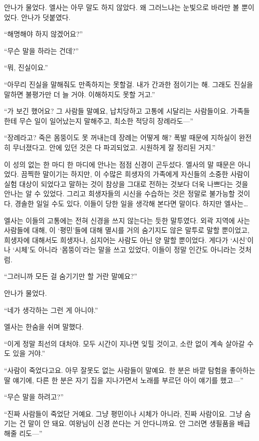 안나가 물었다. 엘사는 아무 말도 하지 않았다. 왜 그러느냐는 눈빛으로 바라만 볼 뿐이었다. 안나가 덧붙였다.

``해명해야 하지 않겠어요?''

``무슨 말을 하라는 건데?''

``뭐, 진실이요.''

``아무리 진실을 말해줘도 만족하지는 못할걸. 내가 간과한 점이기는 해. 그래도 진실을 말하면 불평가만 더 늘 거야. 이해하지도 못할 거고.''

``가 보긴 했어요? 그 사람들 말예요, 납치당하고 고통에 시달리는 사람들이요. 가족들한테 무슨 일이 일어났는지 말해주고, 최소한 적당히 장례라도—''

``장례라고? 죽은 몸뚱이도 못 꺼내는데 장례는 어떻게 해? 폭발 때문에 지하실이 완전히 무너졌다고. 안에 있던 것은 다 파괴되었고. 시원하게 잘 정리된 거지.''

이 성의 없는 한 마디 한 마디에 안나는 점점 신경이 곤두섰다. 엘사의 말 때문은 아니었다. 끔찍한 말이기는 하지만, 이 수많은 희생자의 가족에게 자신들의 소중한 사람이 실험 대상이 되었다고 말하는 것이 참상을 그대로 전하는 것보다 더욱 나쁘다는 것을 안나는 알 수 있었다. 그리고 희생자들의 시신을 수습하는 것은 정말로 불가능할 것이다, 경솔한 일일 수도 있다, 이들이 당한 일을 생각해 본다면 말이다. 하지만 엘사는\ldots

엘사는 이들의 고통에는 전혀 신경을 쓰지 않는다는 듯한 말투였다. 외곽 지역에 사는 사람들에 대해, 이 `평민'들에 대해 멸시를 거의 숨기지도 않은 말투로 말할 뿐이었고, 희생자에 대해서도 희생자나, 심지어는 사람도 아닌 양 말할 뿐이었다. 게다가 `시신'이나 `시체'도 아니라 `몸뚱이'라는 말을 쓰고 있었다, 이들이 정말 인간도 아니라는 것처럼.

``그러니까 모든 걸 숨기기만 할 거란 말예요?''

안나가 물었다.

``네가 생각하는 그런 게 아니야.''

엘사는 한숨을 쉬며 말했다.

``이게 정말 최선의 대처야. 모두 시간이 지나면 잊힐 것이고, 소란 없이 계속 살아갈 수도 있을 거야.''

``사람이 죽었다고요. 아무 잘못도 없는 사람들이 말예요. 한 분은 바깥 탐험을 좋아하는 딸 얘기에, 다른 한 분은 자기 집을 지나가면서 노래를 부르던 아이 얘기를 했고—''

``무슨 말을 하려고?''

``진짜 사람들이 죽었단 거예요. 그냥 평민이나 시체가 아니라, 진짜 사람이요. 그냥 숨기는 건 말이 안 돼요. 여왕님이 신경 쓴다는 거 안다니까요. 안 그러면 생필품을 배급해줄 리도—''

